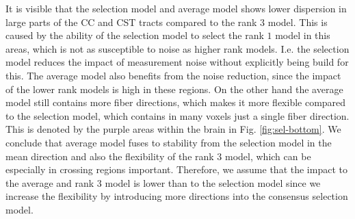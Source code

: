 It is visible that the
selection model and average model shows lower dispersion in large parts of the CC and CST tracts
compared to the rank $3$ model. This is caused by the
ability of the selection model to select the rank $1$ model in this areas, which
is not as susceptible to noise as higher rank models. I.e. the selection model
reduces the impact of measurement noise without explicitly being build for
this. The average model also benefits from the noise reduction, since the impact
of the lower rank models is high in these regions.
On the other hand the average model still contains more fiber directions, which
makes it more flexible compared to the selection model, which contains in many
voxels just a single fiber direction. This is denoted by the purple areas within
the brain in Fig. \ref{fig:sel-bottom}.
We conclude that average model fuses to stability from the selection model in
the mean direction and also the flexibility of the rank $3$ model, which can be
especially in crossing regions important.
Therefore, we assume that the impact to the average and rank $3$ model is lower
than to the selection model since we increase the flexibility by introducing
more directions into the consensus selection model. 



